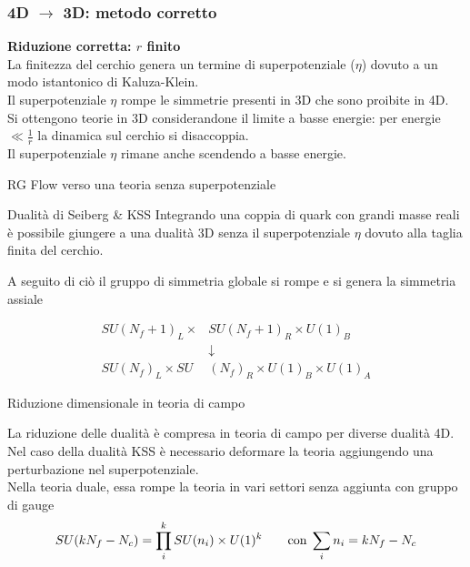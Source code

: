 \documentclass[10pt,compress]{beamer}
\begin{document}
\begin{frame}[fragile]
\frametitle{4D $\longrightarrow $ 3D: metodo corretto}
\begin{center}
{\Large \bfseries Riduzione corretta: $r$ finito}\\
\vspace{0.5cm}
La finitezza del cerchio genera un termine di superpotenziale ($\eta$) dovuto a un modo istantonico di Kaluza-Klein.\\
\vspace{0.3cm}
Il superpotenziale $\eta$ rompe le simmetrie presenti in 3D che sono proibite in 4D.\\
\vspace{0.3cm}
Si ottengono teorie in 3D considerandone il limite a basse energie:
per energie $\ll \frac{1}{r}$ la dinamica sul cerchio si disaccoppia. 
\\
\vspace{0.3cm}
Il superpotenziale $\eta$ rimane anche scendendo  a basse energie.
\end{center}
\end{frame}





\begin{frame}{RG Flow verso una teoria senza superpotenziale}
\begin{block}{Dualità di Seiberg \& KSS}
Integrando una coppia di quark con grandi masse reali è possibile giungere a una dualità 3D senza il superpotenziale $\eta$ dovuto alla taglia finita del cerchio. 
\end{block}

\vspace{0.5cm}
A seguito di ciò il gruppo di simmetria globale si rompe e si genera la simmetria assiale

\begin{align*}
SU(N_f+1)_L \times &SU(N_f+1)_R \times U(1)_B \\
& \downarrow \\
 SU(N_f)_L \times SU& (N_f)_R \times U(1)_B \times U(1)_A
\end{align*}


\end{frame}




\begin{frame}{Riduzione dimensionale in teoria di campo}

La riduzione delle dualità è compresa in teoria di campo per diverse dualità 4D.\\
\vspace{0.3cm}
Nel caso della dualità KSS
è necessario deformare la teoria aggiungendo una perturbazione nel superpotenziale. \\
\vspace{0.3cm}
Nella teoria duale, essa rompe la teoria in vari settori senza aggiunta con gruppo di gauge 
$$
SU(k N_f - N_c)  = \prod_i^k SU(n_i) \times U(1)^k
\qquad \hbox{con} \; \sum_i n_i = k N_f - N_c
$$
\end{frame}
\end{document}
